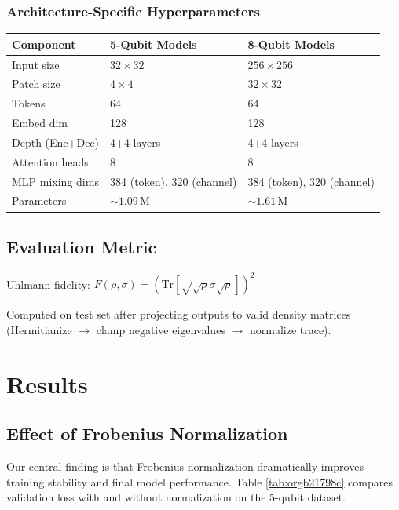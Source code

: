 \documentclass[11pt]{article}
\begin{document}
\subsubsection{Architecture-Specific Hyperparameters}
\label{sec:org715756f}

\begin{center}
\begin{tabular}{lll}
Component & 5-Qubit Models & 8-Qubit Models\\[0pt]
\hline
Input size & \(32\times 32\) & \(256\times 256\)\\[0pt]
Patch size & \(4\times 4\) & \(32\times 32\)\\[0pt]
Tokens & 64 & 64\\[0pt]
Embed dim & 128 & 128\\[0pt]
Depth (Enc+Dec) & 4+4 layers & 4+4 layers\\[0pt]
Attention heads & 8 & 8\\[0pt]
MLP mixing dims & 384 (token), 320 (channel) & 384 (token), 320 (channel)\\[0pt]
Parameters & \(\sim 1.09\,\mathrm{M}\) & \(\sim 1.61\,\mathrm{M}\)\\[0pt]
\end{tabular}
\end{center}

\subsection{Evaluation Metric}
\label{sec:org4b49dd8}

Uhlmann fidelity: \(F(\rho, \sigma) = (\mathrm{Tr}[\sqrt{\sqrt{\rho}\sigma\sqrt{\rho}}])^2\)

Computed on test set after projecting outputs to valid density matrices (Hermitianize \(\to\) clamp negative eigenvalues \(\to\) normalize trace).

\section{Results}
\label{sec:org58c3a5b}

\subsection{Effect of Frobenius Normalization}
\label{sec:org54fd89a}

Our central finding is that Frobenius normalization dramatically improves training stability and final model performance. Table \ref{tab:orgb21798c} compares validation loss with and without normalization on the 5-qubit dataset.
\end{document}

